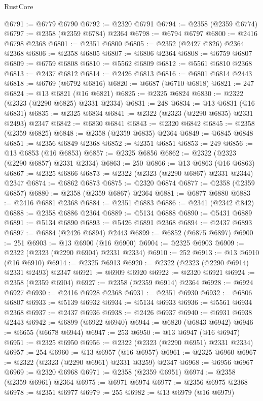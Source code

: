 \begin{lexlean}{RustCore}
\begin{coremodule}
@6791 := @6779 @6790
@6792 := @2320 @6791
@6794 := @2358 (@2359 @6774)
@6797 := @2358 (@2359 @6784) @2364
@6798 := @6794 @6797
@6800 := @2416 @6798 @2368
@6801 := @2351 @6800
@6805 := @2352 (@2427 @826) @2364 @2368
@6806 := @2358 @6805
@6807 := @6806 @2364
@6808 := @6759 @6807
@6809 := @6759 @6808
@6810 := @5562 @6809
@6812 := @5561 @6810 @2368
@6813 := @2437 @6812
@6814 := @2426 @6813
@6816 := @6801 @6814 @2443
@6818 := @6769 (@6792 @6816)
@6820 := @6687 (@6710 @6818)
@6821 := 247
@6824 := @13 @6821 (@16 @6821)
@6825 := @2325 @6824
@6830 := @2322 (@2323 (@2290 @6825) @2331 @2334)
@6831 := 248
@6834 := @13 @6831 (@16 @6831)
@6835 := @2325 @6834
@6841 := @2322 (@2323 (@2290 @6835) @2331 @2493) @2347
@6842 := @6830 @6841
@6843 := @2320 @6842
@6845 := @2358 (@2359 @6825)
@6848 := @2358 (@2359 @6835) @2364
@6849 := @6845 @6848
@6851 := @2356 @6849 @2368
@6852 := @2351 @6851
@6853 := 249
@6856 := @13 @6853 (@16 @6853)
@6857 := @2325 @6856
@6862 := @2322 (@2323 (@2290 @6857) @2331 @2334)
@6863 := 250
@6866 := @13 @6863 (@16 @6863)
@6867 := @2325 @6866
@6873 := @2322 (@2323 (@2290 @6867) @2331 @2344) @2347
@6874 := @6862 @6873
@6875 := @2320 @6874
@6877 := @2358 (@2359 @6857)
@6880 := @2358 (@2359 @6867) @2364
@6881 := @6877 @6880
@6883 := @2416 @6881 @2368
@6884 := @2351 @6883
@6886 := @2341 (@2342 @842)
@6888 := @2358 @6886 @2364
@6889 := @5134 @6888
@6890 := @5431 @6889
@6891 := @5134 @6890
@6893 := @5426 @6891 @2368
@6894 := @2437 @6893
@6897 := @6884 (@2426 @6894) @2443
@6899 := @6852 (@6875 @6897)
@6900 := 251
@6903 := @13 @6900 (@16 @6900)
@6904 := @2325 @6903
@6909 := @2322 (@2323 (@2290 @6904) @2331 @2334)
@6910 := 252
@6913 := @13 @6910 (@16 @6910)
@6914 := @2325 @6913
@6920 := @2322 (@2323 (@2290 @6914) @2331 @2493) @2347
@6921 := @6909 @6920
@6922 := @2320 @6921
@6924 := @2358 (@2359 @6904)
@6927 := @2358 (@2359 @6914) @2364
@6928 := @6924 @6927
@6930 := @2416 @6928 @2368
@6931 := @2351 @6930
@6932 := @6806 @6807
@6933 := @5139 @6932
@6934 := @5134 @6933
@6936 := @5561 @6934 @2368
@6937 := @2437 @6936
@6938 := @2426 @6937
@6940 := @6931 @6938 @2443
@6942 := @6899 (@6922 @6940)
@6944 := @6820 (@6843 @6942)
@6946 := @6655 (@6678 @6944)
@6947 := 253
@6950 := @13 @6947 (@16 @6947)
@6951 := @2325 @6950
@6956 := @2322 (@2323 (@2290 @6951) @2331 @2334)
@6957 := 254
@6960 := @13 @6957 (@16 @6957)
@6961 := @2325 @6960
@6967 := @2322 (@2323 (@2290 @6961) @2331 @3259) @2347
@6968 := @6956 @6967
@6969 := @2320 @6968
@6971 := @2358 (@2359 @6951)
@6974 := @2358 (@2359 @6961) @2364
@6975 := @6971 @6974
@6977 := @2356 @6975 @2368
@6978 := @2351 @6977
@6979 := 255
@6982 := @13 @6979 (@16 @6979)

\end{coremodule}
\end{lexlean}
